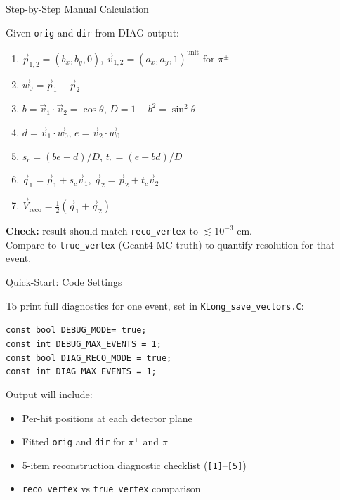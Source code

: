 \documentclass[aspectratio=169,10pt]{beamer}
\begin{document}
\begin{frame}{Step-by-Step Manual Calculation}

Given \texttt{orig} and \texttt{dir} from DIAG output:

\begin{enumerate}
    \item $\vec{p}_{1,2} = (b_x, b_y, 0)$, \quad $\vec{v}_{1,2} = (a_x, a_y, 1)^\text{unit}$ for $\pi^\pm$
    \item $\vec{w}_0 = \vec{p}_1 - \vec{p}_2$
    \item $b = \vec{v}_1 \cdot \vec{v}_2 = \cos\theta$, \quad $D = 1 - b^2 = \sin^2\theta$
    \item $d = \vec{v}_1 \cdot \vec{w}_0$, \quad $e = \vec{v}_2 \cdot \vec{w}_0$
    \item $s_c = (be - d)/D$, \quad $t_c = (e - bd)/D$
    \item $\vec{q}_{1} = \vec{p}_1 + s_c\vec{v}_1$, \quad $\vec{q}_{2} = \vec{p}_2 + t_c\vec{v}_2$
    \item $\vec{V}_\text{reco} = \tfrac{1}{2}(\vec{q}_1 + \vec{q}_2)$
\end{enumerate}

\medskip
\textbf{Check:} result should match \texttt{reco\_vertex} to $\lesssim 10^{-3}$ cm.\\
Compare to \texttt{true\_vertex} (Geant4 MC truth) to quantify resolution for that event.

\end{frame}

\begin{frame}{Quick-Start: Code Settings}

To print full diagnostics for one event, set in \texttt{KLong\_save\_vectors.C}:

\medskip
\begin{block}{}
\texttt{const bool DEBUG\_MODE\phantom{xxx}= true;} \\
\texttt{const int\phantom{x} DEBUG\_MAX\_EVENTS = 1;} \\
\texttt{const bool DIAG\_RECO\_MODE\phantom{} = true;} \\
\texttt{const int\phantom{x} DIAG\_MAX\_EVENTS\phantom{} = 1;}
\end{block}

\medskip
Output will include:
\begin{itemize}
    \item Per-hit positions at each detector plane
    \item Fitted \texttt{orig} and \texttt{dir} for $\pi^+$ and $\pi^-$
    \item 5-item reconstruction diagnostic checklist (\texttt{[1]}--\texttt{[5]})
    \item \texttt{reco\_vertex} vs \texttt{true\_vertex} comparison
\end{itemize}

\end{frame}
\end{document}
